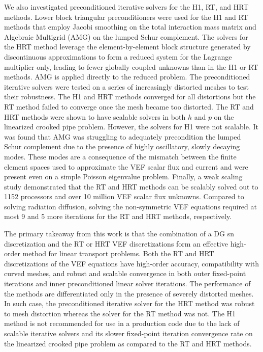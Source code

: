 \documentclass[../doc.tex]{subfiles}
\begin{document}
We also investigated preconditioned iterative solvers for the H1, RT, and HRT methods. Lower block triangular preconditioners were used for the H1 and RT methods that employ Jacobi smoothing on the total interaction mass matrix and Algebraic Multigrid (AMG) on the lumped Schur complement. The solvers for the HRT method leverage the element-by-element block structure generated by discontinuous approximations to form a reduced system for the Lagrange multiplier only, leading to fewer globally coupled unknowns than in the H1 or RT methods. AMG is applied directly to the reduced problem. The preconditioned iterative solvers were tested on a series of increasingly distorted meshes to test their robustness. The H1 and HRT methods converged for all distortions but the RT method failed to converge once the mesh became too distorted. The RT and HRT methods were shown to have scalable solvers in both $h$ and $p$ on the linearized crooked pipe problem. However, the solvers for H1 were not scalable. It was found that AMG was struggling to adequately precondition the lumped Schur complement due to the presence of highly oscillatory, slowly decaying modes. These modes are a consequence of the mismatch between the finite element spaces used to approximate the VEF scalar flux and current and were present even on a simple Poisson eigenvalue problem. Finally, a weak scaling study demonstrated that the RT and HRT methods can be scalably solved out to 1152 processors and over 10 million VEF scalar flux unknowns. Compared to solving radiation diffusion, solving the non-symmetric VEF equations required at most 9 and 5 more iterations for the RT and HRT methods, respectively.

The primary takeaway from this work is that the combination of a DG \gls{sn} discretization and the RT or HRT VEF discretizations form an effective high-order method for linear transport problems. 
Both the RT and HRT discretizations of the VEF equations have high-order accuracy, compatibility with curved meshes, and robust and scalable convergence in both outer fixed-point iterations and inner preconditioned linear solver iterations. 
The performance of the methods are differentiated only in the presence of severely distorted meshes. In such case, the preconditioned iterative solver for the HRT method was robust to mesh distortion whereas the solver for the RT method was not. 
The H1 method is not recommended for use in a production code due to the lack of scalable iterative solvers and its slower fixed-point iteration convergence rate on the linearized crooked pipe problem as compared to the RT and HRT methods. 
\end{document}
